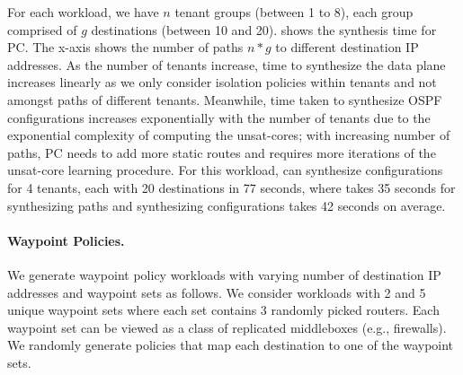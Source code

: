 For each 
workload, we have $n$ tenant groups (between 1 to 8), 
each group comprised of $g$ destinations (between 10 and 20). 
shows the synthesis time 
for PC.
The x-axis shows the number of paths $n * g$ 
to different destination IP addresses. 
 As the number of tenants increase, time to 
synthesize the data plane increases linearly as we only 
consider isolation policies within tenants 
and not amongst paths 
of different tenants. Meanwhile, time taken to synthesize 
OSPF configurations increases exponentially with the 
number of tenants due to the exponential complexity of computing 
the unsat-cores; with increasing number of 
paths, PC needs to add more static routes 
and requires more iterations of the unsat-core learning
procedure. 
For this workload, \name can
synthesize configurations for 4 tenants, each with
20 destinations in 77 seconds, where \genesis takes 35 seconds
for synthesizing paths and synthesizing configurations
takes 42 seconds on average. 



\begin{figure}
	\begin{center}
	\end{center} 
\end{figure}
\paragraph{Waypoint Policies.}
We generate waypoint policy 
workloads with varying number of destination IP addresses and 
waypoint sets as follows. 
We consider workloads with 2 and 5 unique waypoint 
sets where each set contains 3 randomly picked routers.  
Each waypoint set can be 
viewed as a class of replicated middleboxes (e.g., firewalls).
We randomly generate policies that map each destination to one of the waypoint sets. 

